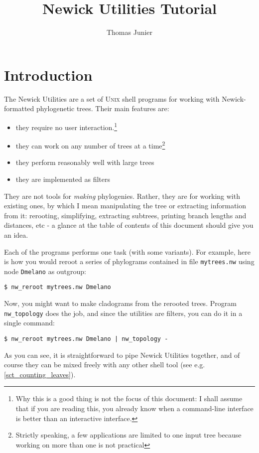 \documentclass[a4paper,10pt]{report}
\title{Newick Utilities Tutorial}
\author{Thomas Junier}
\newcommand{\nutils}{Newick Utilities}
\newcommand{\unix}{\textsc{Unix}}
\newcommand{\topology}{\texttt{nw\_topology}}
\theoremstyle{definition}
\theoremstyle{definition}
\begin{document}
\maketitle
\tableofcontents

\chapter{Introduction}

The \nutils{} are a set of \unix{} shell programs for working with Newick-formatted phylogenetic trees. Their main features are:
\begin{itemize}
 \item they require no user interaction.\footnote{Why this is a good thing is not the focus of this document: I shall assume that if you are reading this, you already know when a command-line interface is better than an interactive interface.}
 \item they can work on any number of trees at a time\footnote{Strictly speaking, a few applications are limited to one input tree because working on more than one is not practical}
 \item they perform reasonably well with large trees
 \item they are implemented as filters
\end{itemize}
They are not tools for \emph{making} phylogenies. Rather, they are for working with existing ones, by which I mean manipulating the tree or extracting information from it: rerooting, simplifying, extracting subtrees, printing branch lengths and distances, etc - a glance at the table of contents of this document should give you an idea.

Each of the programs performs one task (with some variants). For example, here is how you would reroot a series of phylograms contained in file \texttt{mytrees.nw} using node \texttt{Dmelano} as outgroup:

\begin{verbatim}
$ nw_reroot mytrees.nw Dmelano
\end{verbatim} 
Now, you might want to make cladograms from the rerooted trees. Program \topology{} does the job, and since the utilities are filters, you can do it in a single command:
\begin{verbatim}
$ nw_reroot mytrees.nw Dmelano | nw_topology -
\end{verbatim}
As you can see, it is straightforward to pipe \nutils{} together, and of course they can be mixed freely with any other shell tool (see e.g. \ref{sct_counting_leaves}).
\end{document}
